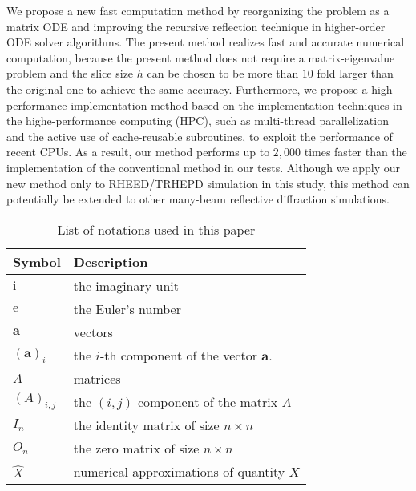 \documentclass[preprint, 5p, times, sort&compress]{elsarticle}
\def\imag{\mathrm{i}}
\def\ee{\mathrm{e}}
\begin{document}
        We propose a new fast computation method by reorganizing the problem as a matrix ODE and
        improving the recursive reflection technique in higher-order ODE solver algorithms. 
        The present method realizes fast and accurate numerical computation, because the present method does not require a matrix-eigenvalue problem and the slice size $h$ can be chosen to be  
        more than $10$ fold larger than the original one to achieve the same accuracy.
        Furthermore, we propose a high-performance implementation method based on the implementation techniques in the highe-performance computing (HPC),
        such as multi-thread parallelization and the active use of cache-reusable subroutines,
        to exploit the performance of recent CPUs.
        As a result, our method performs up to $2,000$ times faster than the implementation of the conventional method in our tests.
        Although we apply our new method only to RHEED\slash TRHEPD simulation in this study, this method can potentially be extended to
        other many-beam reflective diffraction simulations.
        

        \begin{table}
                \centering \caption{List of notations used in this paper}\label{tab:notations}
                \begin{tabular}{ll}
                        \toprule
                        Symbol & Description \\
                        \midrule
                        $\imag$ & the imaginary unit\\
                        $\ee$ & the Euler's number\\
                        $\bm{a}$ & vectors\\
                        $(\bm{a})_i$ & the $i$-th component of the vector $\bm{a}$.\\
                        $A$ & matrices\\
                        $(A)_{i,j}$ & the $(i, j)$ component of the matrix $A$ \\
                        $I_n$ & the identity matrix of size $n\times n$\\
                        $O_n$ & the zero matrix of size $n\times n$ \\
                        $\hat{X}$ & numerical approximations of quantity $X$ \\
                        \bottomrule
                \end{tabular}
        \end{table}
\end{document}
